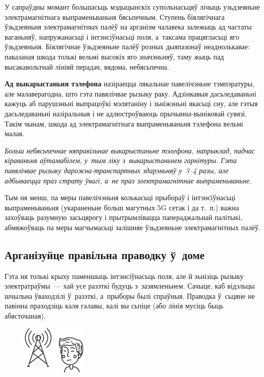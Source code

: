 У сапраўдны момант большасьць мэдыцынскіх супольнасьцяў лічыць узьдзеяньне электрамагнітнага выпраменьваньня бясьпечным. Ступень біялягічнага ўзьдзеяньня электрамагнітных палёў на арганізм чалавека залежыць ад частаты ваганьняў, напружанасьці і інтэнсіўнасьці поля, а~таксама працягласьці яго ўзьдзеяньня. Біялягічнае ўзьдзеяньне палёў розных дыяпазонаў неаднолькавае: паказаная шкода толькі вельмі высокіх яго значэньняў, таму жыць пад высакавольтнай лініяй перадач, вядома, небясьпечна.

\textbf{Ад выкарыстаньня тэлефона} назіраецца лякальнае павелічэньне тэмпэратуры, але малаверагодна, што гэта павялічвае рызыку раку. Адзінкавыя дасьледаваньні кажуць аб парушэньні выпрацоўкі мэлятаніну і зьніжэньні якасьці сну, але гэтыя дасьледаваньні назіральныя і не адлюстроўваюць прычынна-выніковай сувязі. Такім чынам, шкода ад электрамагнітнага выпраменьваньня тэлефона вельмі малая. 

\emph{Больш небясьпечнае няправільнае выкарыстаньне тэлефона, напрыклад, падчас кіраваньня аўтамабілем, у~тым ліку з~выкарыстаньнем гарнітуры. Гэта павялічвае рызыку дарожна-транспартных здарэньняў у~3--4 разы, але адбываецца праз страту ўвагі, а~не праз электрамагнітнае выпраменьваньне.}

Тым ня менш, па меры павелічэньня колькасьці прыбораў і інтэнсіўнасьці выпраменьваньня (укараненьне больш магутных 5G сетак і да т.~п.) важна захоўваць разумную засьцярогу і прытрымлівацца папераджальнай палітыкі, абмяжоўваць па меры магчымасьці залішняе ўзьдзеяньне электрамагнітных палёў.

\subsection*{Арганізуйце правільна праводку ў~доме}

Гэта ня толькі крыху паменшыць інтэнсіўнасьць поля, але й зьнізіць рызыку электратраўмы~--- хай усе разэткі будуць з~зазямленьнем. Сачыце, каб відэльцы шчыльна ўваходзілі ў~разэткі, а~прыборы былі спраўныя. Праводка ў~сьцяне не павінна праходзіць каля галавы, калі вы сьпіце (або лінія мусіць быць абясточаная).

\begin{figure}[htb!]
  \centering
  \includegraphics[scale=1.5]{willpower/ch11/11.pdf}
\end{figure}

